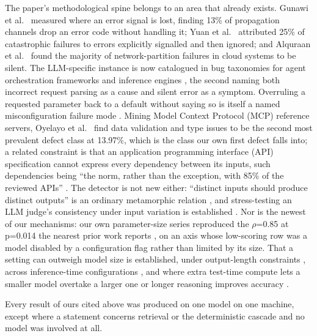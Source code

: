 The paper's methodological spine belongs to an area that already exists. Gunawi et al.~\cite{gunawi2008eio}
measured where an error signal is lost, finding 13\% of propagation channels drop an error code
without handling it; Yuan et al.~\cite{yuan2014simple} attributed 25\% of catastrophic failures to errors
explicitly signalled and then ignored; and Alquraan et al.~\cite{alquraan2018partition} found the majority of
network-partition failures in cloud systems to be silent. The LLM-specific instance is now
catalogued in bug taxonomies for agent orchestration frameworks \citep{xue2025agentbugs} and
inference engines \citep{liu2026inference}, the second naming both incorrect request parsing as a
cause and silent error as a symptom. Overruling a requested parameter back to a default without
saying so is itself a named misconfiguration failure mode \citep{xu2013misconfig}. Mining Model
Context Protocol (MCP) reference servers, Oyelayo et al.~\cite{oyelayo2026mcp} find data validation and type
issues to be the second most prevalent defect class at 13.97\%, which is the class our own first
defect falls into; a related constraint is that an application programming interface (API)
specification cannot express every dependency between its inputs, such dependencies being ``the
norm, rather than the exception, with 85\% of the reviewed APIs'' \citep{martinlopez2019deps}. The
detector is not new either: ``distinct inputs should produce distinct outputs'' is an ordinary
metamorphic relation \citep{li2024metamorphic}, and stress-testing an LLM judge's consistency under
input variation is established \citep{dev2026judge}. Nor is the newest of our mechanisms: our own
parameter-size series reproduced the $\rho$=0.85 at p=0.014 the nearest prior work reports
, on an axis whose low-scoring row was a model disabled by a
configuration flag rather than limited by its size. That a setting can outweigh model size is
established, under output-length constraints \citep{sun2025length}, across inference-time
configurations \citep{mizrahi2024multiprompt}, and where extra test-time compute lets a smaller
model overtake a larger one \citep{snell2025testtime,hassid2024budget} or longer reasoning improves
accuracy \citep{jin2024steplength}.

Every result of ours cited above was produced on one model on one machine, except where a statement
concerns retrieval or the deterministic cascade and no model was involved at all.
